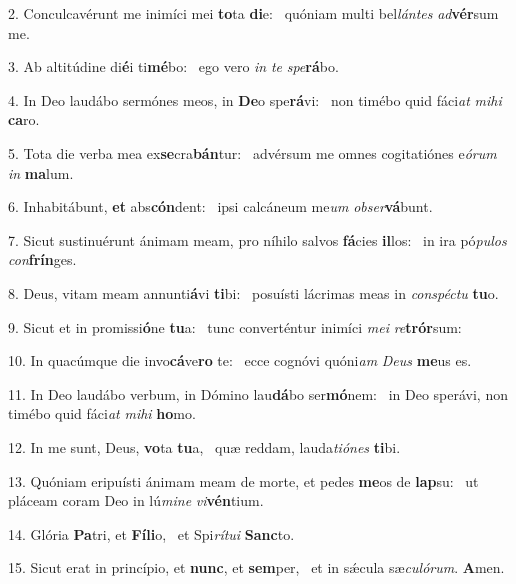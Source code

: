 2. Conculcavérunt me inimíci mei \textbf{to}ta \textbf{di}e: \ast\  quóniam multi bel\textit{lán}\textit{tes} \textit{ad}\textbf{vér}sum me.\

3. Ab altitúdine di\textbf{é}i ti\textbf{mé}bo: \ast\  ego vero \textit{in} \textit{te} \textit{spe}\textbf{rá}bo.\

4. In Deo laudábo sermónes meos, in \textbf{De}o spe\textbf{rá}vi: \ast\  non timébo quid fáci\textit{at} \textit{mi}\textit{hi} \textbf{ca}ro.\

5. Tota die verba mea ex\textbf{se}cra\textbf{bán}tur: \ast\  advérsum me omnes cogitatiónes e\textit{ó}\textit{rum} \textit{in} \textbf{ma}lum.\

6. Inhabitábunt, \textbf{et} abs\textbf{cón}dent: \ast\  ipsi calcáneum me\textit{um} \textit{ob}\textit{ser}\textbf{vá}bunt.\

7. Sicut sustinuérunt ánimam meam, pro níhilo salvos \textbf{fá}cies \textbf{il}los: \ast\  in ira pó\textit{pu}\textit{los} \textit{con}\textbf{frín}ges.\

8. Deus, vitam meam annunti\textbf{á}vi \textbf{ti}bi: \ast\  posuísti lácrimas meas in \textit{con}\textit{spéc}\textit{tu} \textbf{tu}o.\

9. Sicut et in promissi\textbf{ó}ne \textbf{tu}a: \ast\  tunc converténtur inimíci \textit{me}\textit{i} \textit{re}\textbf{trór}sum:\

10. In quacúmque die invo\textbf{cá}ve\textbf{ro} te: \ast\  ecce cognóvi quóni\textit{am} \textit{De}\textit{us} \textbf{me}us es.\

11. In Deo laudábo verbum, in Dómino lau\textbf{dá}bo ser\textbf{mó}nem: \ast\  in Deo sperávi, non timébo quid fáci\textit{at} \textit{mi}\textit{hi} \textbf{ho}mo.\

12. In me sunt, Deus, \textbf{vo}ta \textbf{tu}a, \ast\  quæ reddam, lauda\textit{ti}\textit{ó}\textit{nes} \textbf{ti}bi.\

13. Quóniam eripuísti ánimam meam de morte, et pedes \textbf{me}os de \textbf{lap}su: \ast\  ut pláceam coram Deo in lú\textit{mi}\textit{ne} \textit{vi}\textbf{vén}tium.\

14. Glória \textbf{Pa}tri, et \textbf{Fí}\textbf{li}o, \ast\  et Spi\textit{rí}\textit{tu}\textit{i} \textbf{Sanc}to.\

15. Sicut erat in princípio, et \textbf{nunc}, et \textbf{sem}per, \ast\  et in sǽcula sæ\textit{cu}\textit{ló}\textit{rum}. \textbf{A}men.\

